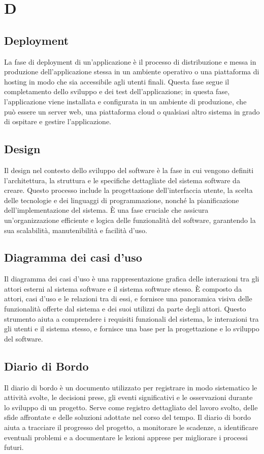\section*{D} 
\subsection*{Deployment} 
La fase di deployment di un'applicazione è il processo di distribuzione e messa in produzione dell'applicazione stessa in un ambiente operativo o una piattaforma di hosting in modo che sia accessibile agli utenti finali. Questa fase segue il completamento dello sviluppo e dei test dell'applicazione; in questa fase, l'applicazione viene installata e configurata in un ambiente di produzione, che può essere un server web, una piattaforma cloud o qualsiasi altro sistema in grado di ospitare e gestire l'applicazione.
\subsection*{Design} 
Il design nel contesto dello sviluppo del software è la fase in cui vengono definiti l'architettura, la struttura e le specifiche dettagliate del sistema software da creare. Questo processo include la progettazione dell'interfaccia utente, la scelta delle tecnologie e dei linguaggi di programmazione, nonché la pianificazione dell'implementazione del sistema. È una fase cruciale che assicura un'organizzazione efficiente e logica delle funzionalità del software, garantendo la sua scalabilità, manutenibilità e facilità d'uso.
\subsection*{Diagramma dei casi d'uso} 
Il diagramma dei casi d'uso è una rappresentazione grafica delle interazioni tra gli attori esterni al sistema software e il sistema software stesso. È composto da attori, casi d'uso e le relazioni tra di essi, e fornisce una panoramica visiva delle funzionalità offerte dal sistema e dei suoi utilizzi da parte degli attori. Questo strumento aiuta a comprendere i requisiti funzionali del sistema, le interazioni tra gli utenti e il sistema stesso, e fornisce una base per la progettazione e lo sviluppo del software.
\subsection*{Diario di Bordo} 
Il diario di bordo è un documento utilizzato per registrare in modo sistematico le attività svolte, le decisioni prese, gli eventi significativi e le osservazioni durante lo sviluppo di un progetto. Serve come registro dettagliato del lavoro svolto, delle sfide affrontate e delle soluzioni adottate nel corso del tempo. Il diario di bordo aiuta a tracciare il progresso del progetto, a monitorare le scadenze, a identificare eventuali problemi e a documentare le lezioni apprese per migliorare i processi futuri.
